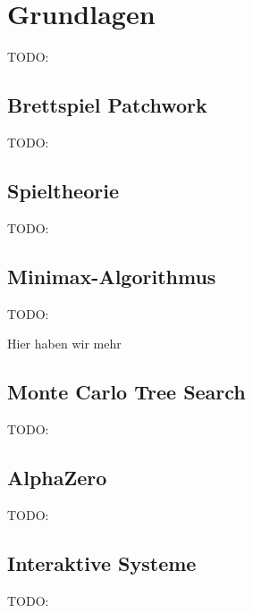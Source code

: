 \chapter{Grundlagen}
\label{chapter:grundlagen}

TODO:

\section{Brettspiel Patchwork}
\label{chapter:brettspiel-patchwork}

TODO:

\section{Spieltheorie}
\label{chapter:spieltheorie}

TODO:

\section{Minimax-Algorithmus}
\label{chapter:minimax-algorithmus}

TODO:

Hier haben wir mehr

\section{Monte Carlo Tree Search}
\label{chapter:monte-carlo-tree-search}

TODO:

\section{AlphaZero}
\label{chapter:alphazero}

TODO:

\section{Interaktive Systeme}
\label{chapter:interaktive-systeme}

TODO:

